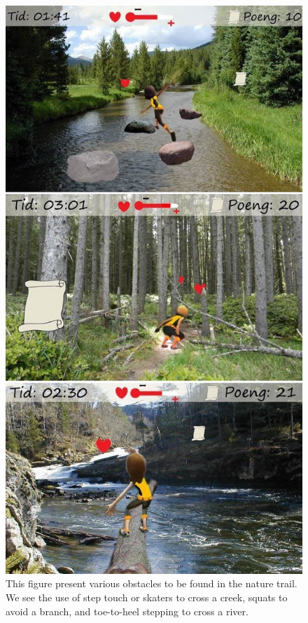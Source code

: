 \begin{figure} [H]
\centering
\includegraphics[scale=0.45]{hindring1.jpg}
\caption[Nature trail - obstacles, part one]{This figure present various obstacles to be found in the nature trail. We see the use of step touch or skaters to cross a creek, squats to avoid a branch, and toe-to-heel stepping to cross a river.}
\label{fig:hindring1}
\end{figure}

